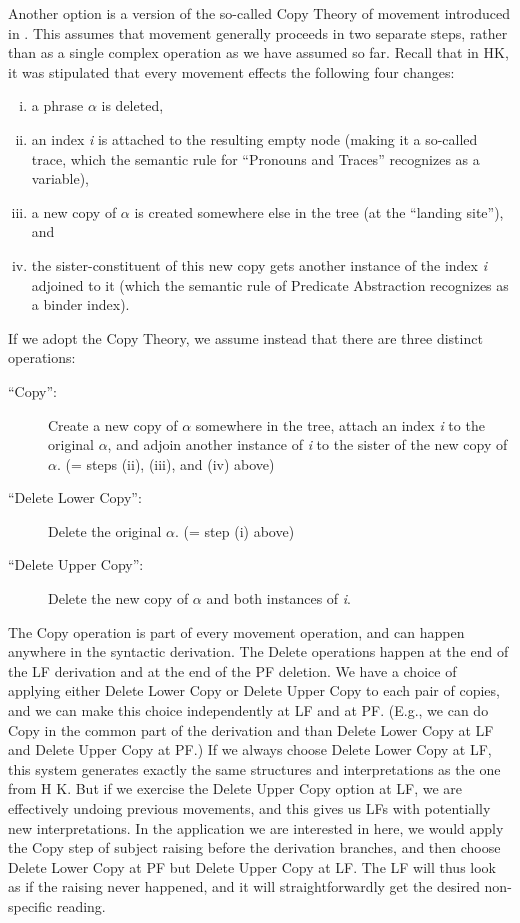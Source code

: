 Another option is a version of the so-called Copy Theory of movement introduced
in \citet{chomsky:1993:minimalist}. This assumes that movement generally
proceeds in two separate steps, rather than as a single complex operation as we
have assumed so far. Recall that in H\amp K, it was stipulated that every
movement effects the following four changes:

\begin{enumerate}
	[(i)] 
\item a phrase $\alpha$ is deleted,
\item an index \emph{i} is attached to the resulting empty node (making it a
  so-called trace, which the semantic rule for ``Pronouns and Traces''
  recognizes as a variable),
\item a new copy of $\alpha$ is created somewhere else in the tree (at the
  ``landing site''), and
\item the sister-constituent of this new copy gets another instance of the index
  \emph{i} adjoined to it (which the semantic rule of Predicate Abstraction
  recognizes as a binder index).
\end{enumerate}

If we adopt the Copy Theory, we assume instead that there are three distinct
operations:

\begin{description}
	
\item[``Copy'':] Create a new copy of $\alpha$ somewhere in the tree, attach an
  index \emph{i} to the original $\alpha$, and adjoin another instance of
  \emph{i} to the sister of the new copy of $\alpha$. (= steps (ii), (iii), and
  (iv) above)
	
\item[``Delete Lower Copy'':] Delete the original $\alpha$. (= step (i) above)
	
\item[``Delete Upper Copy'':] Delete the new copy of $\alpha$ and both instances
  of \emph{i}.
\end{description}
%
The Copy operation is part of every movement operation, and can happen
anywhere in the syntactic derivation. The Delete operations happen at the end of
the LF derivation and at the end of the PF deletion. We have a choice of
applying either Delete Lower Copy or Delete Upper Copy to each pair of copies,
and we can make this choice independently at LF and at PF. (E.g., we can do Copy
in the common part of the derivation and than Delete Lower Copy at LF and Delete
Upper Copy at PF.) If we always choose Delete Lower Copy at LF, this system
generates exactly the same structures and interpretations as the one from H\amp
K. But if we exercise the Delete Upper Copy option at LF, we are effectively
undoing previous movements, and this gives us LFs with potentially new
interpretations. In the application we are interested in here, we would apply
the Copy step of subject raising before the derivation branches, and then choose
Delete Lower Copy at PF but Delete Upper Copy at LF. The LF will thus look as if
the raising never happened, and it will straightforwardly get the desired
non-specific reading.

